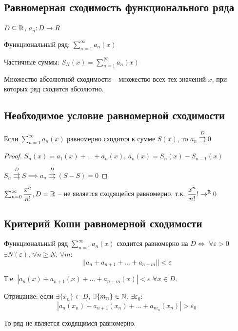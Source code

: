 \subsection{Равномерная сходимость функционального ряда}
$D \subseteq \mathbb{R}$, $a_n: D \to R$

Функциональный ряд: $\sum_{n=1}^{\infty} a_n(x)$

Частичные суммы: $S_N(x) = \sum_{n=1}^{N} a_n(x)$

Множество абсолютной сходимости -- множество всех тех значений $x$, при которых ряд сходится абсолютно.

\subsection{Необходимое условие равномерной сходимости}

Если $\sum_{n=1}^{\infty} a_n(x)$ равномерно сходится к сумме $S(x)$, то $a_n \overset{D}{\rightrightarrows} 0$

\begin{proof}
$S_n(x) = a_1(x) + \dots + a_n(x)$, $a_n(x) = S_n(x) - S_{n-1}(x)$

$S_n \overset{D}{\rightrightarrows} S \implies a_n \overset{D}{\rightrightarrows} (S - S) = 0$
\end{proof}

\begin{example}
$\sum_{n=0}^{\infty} \dfrac{x^n}{n!}, D = \mathbb{R}$ -- не является сходящейся равномерно, т.к. $\dfrac{x^n}{n!} ! \to^{\mathbb{R}} 0$
\end{example}

\subsection{Критерий Коши равномерной сходимости}
\begin{theorem}
Функциональный ряд $\sum_{n=1}^{\infty} a_n(x)$ сходится равномерно на $D \iff$ $\forall \varepsilon > 0$ $\exists N(\varepsilon)$, $\forall n \geq N$, $\forall m$: 
$$||a_n + a_{n + 1} + \dots + a_{n + m}|| < \varepsilon$$

Т.е. $|a_n(x) + a_{n + 1}(x) + \dots + a_{n + m}(x)| < \varepsilon$ $\forall x \in D$.
\end{theorem}

Отрицание: если $\exists \{x_n\} \subset D$, $\exists \{m_n\} \in \mathbb{N}$, $\exists \varepsilon_0$:
$$|a_n(x_n) + a_{n + 1}(x_n) + \dots + a_{m_n}(x_n)| > \varepsilon_0$$

То ряд не является сходящимся равномерно.

